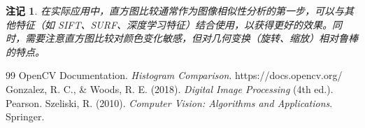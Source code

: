 \documentclass{article}
\newtheorem{remark}{注记}[section]
\begin{document}
\begin{remark}
在实际应用中，直方图比较通常作为图像相似性分析的第一步，可以与其他特征（如 SIFT、SURF、深度学习特征）结合使用，以获得更好的效果。同时，需要注意直方图比较对颜色变化敏感，但对几何变换（旋转、缩放）相对鲁棒的特点。
\end{remark}

\begin{thebibliography}{99}
 OpenCV Documentation. \emph{Histogram Comparison}. https://docs.opencv.org/
 Gonzalez, R. C., \& Woods, R. E. (2018). \emph{Digital Image Processing} (4th ed.). Pearson.
 Szeliski, R. (2010). \emph{Computer Vision: Algorithms and Applications}. Springer.
\end{thebibliography}
\end{document}
